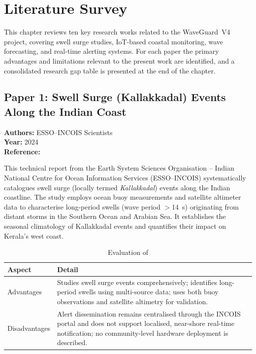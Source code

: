 \chapter{Literature Survey}
\label{chap:litsurvey}

This chapter reviews ten key research works related to the WaveGuard~V4 project,
covering swell surge studies, IoT-based coastal monitoring, wave forecasting, and
real-time alerting systems.
For each paper the primary advantages and limitations relevant to the present work are
identified, and a consolidated research gap table is presented at the end of the chapter.

\section{Paper 1: Swell Surge (Kallakkadal) Events Along the Indian Coast}

\textbf{Authors:} ESSO--INCOIS Scientists\\
\textbf{Year:} 2024\\
\textbf{Reference:} \cite{incois2024kallakkadal}

This technical report from the Earth System Sciences Organisation -- Indian National
Centre for Ocean Information Services (ESSO--INCOIS) systematically catalogues swell
surge (locally termed \textit{Kallakkadal}) events along the Indian coastline.
The study employs ocean buoy measurements and satellite altimeter data to characterise
long-period swells (wave period $>$14~s) originating from distant storms in the Southern
Ocean and Arabian Sea.
It establishes the seasonal climatology of Kallakkadal events and quantifies their
impact on Kerala's west coast.

\begin{table}[H]
\centering
\caption{Evaluation of \cite{incois2024kallakkadal}}
\label{tab:paper1}
\begin{tabularx}{\textwidth}{lX}
\toprule
\textbf{Aspect} & \textbf{Detail} \\
\midrule
Advantages &
  Studies swell surge events comprehensively;
  identifies long-period swells using multi-source data;
  uses both buoy observations and satellite altimetry for validation. \\
\addlinespace
Disadvantages &
  Alert dissemination remains centralised through the INCOIS portal and does
  not support localised, near-shore real-time notification;
  no community-level hardware deployment is described. \\
\bottomrule
\end{tabularx}
\end{table}

